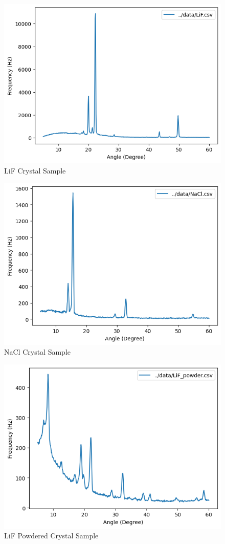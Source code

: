 \documentclass[a4paper,12pt,english]{all-in-one} %
\begin{document}
\begin{figure}[tbh]
    \centering
    \includegraphics[width=0.8\linewidth]{3-xray/overleaf/images/LiF.png}
    \caption{ \scriptsize{ LiF Crystal Sample
    }}
    \label{fig:xray-diagram}
\end{figure}

\begin{figure}[tbh]
    \centering
    \includegraphics[width=0.8\linewidth]{3-xray/overleaf/images/NaCl.png}
    \caption{ \scriptsize{ NaCl Crystal Sample
    }}
    \label{fig:xray-diagram}
\end{figure}


\begin{figure}[tbh]
    \centering
    \includegraphics[width=0.8\linewidth]{3-xray/overleaf/images/LiD_powder.png}
    \caption{ \scriptsize{ LiF Powdered Crystal Sample
    }}
    \label{fig:xray-diagram}
\end{figure}
\end{document}
